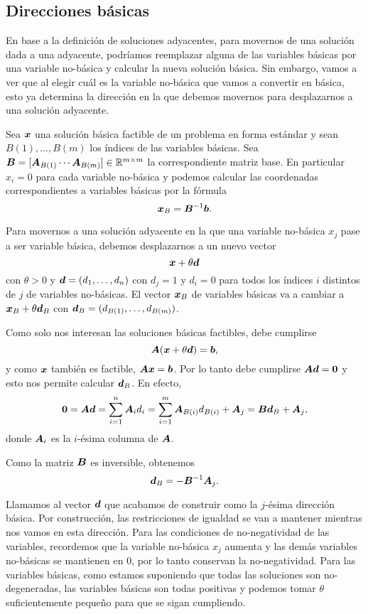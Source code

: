 \subsection{Direcciones básicas}

En base a la definición de soluciones adyacentes, para movernos de una solución dada a una adyacente, podríamos reemplazar alguna de las variables básicas por una variable no-básica y calcular la nueva solución básica. Sin embargo, vamos a ver que al elegir cuál es la variable no-básica que vamos a convertir en básica, esto ya determina la dirección en la que debemos movernos para desplazarnos a una solución adyacente.

Sea $\bm{x}$ una solución básica factible de un problema en forma estándar y sean $B(1), \dots, B(m)$ los índices de las variables básicas. Sea $\bm{B} = [ \bm{A}_{B(1)} \cdots \bm{A}_{B(m)}] \in \mathbb{R}^{m \times m}$ la correspondiente matriz base. En particular $x_i = 0$ para cada variable no-básica y  podemos calcular las coordenadas correspondientes a variables básicas por la fórmula
$$
\bm{x}_B = \bm{B}^{-1}\bm{b}.
$$

Para movernos a una solución adyacente en la que una variable no-básica $x_j$ pase a ser variable básica, debemos desplazarnos a un nuevo vector $$\bm{x} + \theta \bm{d}$$
con $\theta > 0$ y $\bm{d} = (d_1, \dots, d_n)$ con $d_j =1$ y $d_i = 0$ para todos los índices $i$ distintos de $j$ de variables no-básicas. El vector $\bm{x}_B$ de variables básicas va a cambiar a $\bm{x}_B + \theta \bm{d}_B$ con $\bm{d}_B = (d_{B(1)}, \dots, d_{B(m)})$.

Como solo nos interesan las soluciones básicas factibles, debe cumplirse
$$
\bm{A}(\bm{x} + \theta \bm{d}) = \bm{b},
$$
y como $\bm{x}$ también es factible, $\bm{A} \bm{x} = \bm{b}$. Por lo tanto debe cumplirse $\bm{A} \bm{d} = \bm{0}$ y esto nos permite calcular $\bm{d}_B$. En efecto,
$$
\bm{0} = \bm{A} \bm{d} = \sum_{i=1}^n \bm{A}_i d_i = \sum_{i=1}^m \bm{A}_{B(i)} d_{B(i)} + \bm{A}_j = \bm{B} \bm{d}_B + \bm{A}_j,$$
donde $\bm{A}_i$ es la $i$-ésima columna de $\bm{A}$.

Como la matriz $\bm{B}$ es inversible, obtenemos
$$
\bm{d}_B = -\bm{B}^{-1} \bm{A}_j.
$$

Llamamos al vector $\bm{d}$ que acabamos de construir como la $j$-ésima dirección básica. Por construcción, las restricciones de igualdad se van a mantener mientras nos vamos en esta dirección. Para las condiciones de no-negatividad de las variables, recordemos que la variable no-básica $x_j$ aumenta y las demás variables no-básicas se mantienen en 0, por lo tanto conservan la no-negatividad. Para las variables básicas, como estamos suponiendo que todas las soluciones son no-degeneradas, las variables básicas son todas positivas y podemos tomar $\theta$ suficientemente pequeño para que se sigan cumpliendo.

